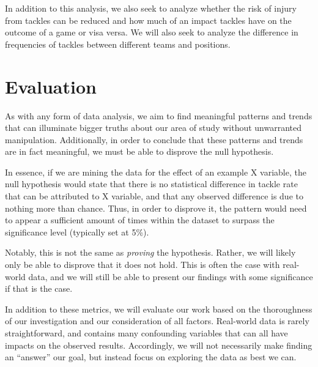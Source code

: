 \documentclass[sigconf, hyperref={colorlinks=true,linkcolor=blue,urlcolor=blue}]{acmart}
\begin{document}
In addition to this analysis, we also seek to analyze whether the risk of injury
from tackles can be reduced and how much of an impact tackles have on the
outcome of a game or visa versa. We will also seek to analyze the difference in
frequencies of tackles between different teams and positions.

\section{Evaluation}

As with any form of data analysis, we aim to find meaningful patterns and trends
that can illuminate bigger truths about our area of study without unwarranted
manipulation. Additionally, in order to conclude that these patterns and trends are
in fact meaningful, we must be able to disprove the null hypothesis.

In essence, if we are mining the data for the effect of an example X variable, the null
hypothesis would state that there is no statistical difference in tackle rate that can be
attributed to X variable, and that any observed difference is due to nothing more than chance.
Thus, in order to disprove it, the pattern would need to appear a sufficient amount of times
within the dataset to surpass the significance level (typically set at 5\%).

Notably, this is not the same as \textit{proving} the hypothesis. Rather, we will likely
only be able to disprove that it does not hold. This is often the case with real-world data,
and we will still be able to present our findings with some significance if that is the case.

In addition to these metrics, we will evaluate our work based on the thoroughness of our
investigation and our consideration of all factors. Real-world data is rarely straightforward,
and contains many confounding variables that can all have impacts on the observed results.
Accordingly, we will not necessarily make finding an “answer” our goal, but instead focus on
exploring the data as best we can.
\end{document}
